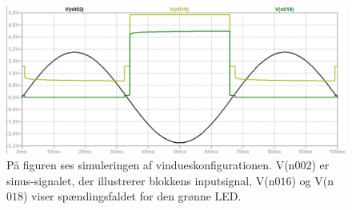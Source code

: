 \begin{figure}[H]
	\centering
	\includegraphics[scale=0.36]{figures/cProblemloesning/vindues_konfiguration.PNG}
	\caption{På figuren ses simuleringen af vindueskonfigurationen. V(n$002$) er sinus-signalet, der illustrerer blokkens inputsignal, V(n$016$) og V(n$018$) viser spændingsfaldet for den grønne LED.}
	\label{fig:vindues_konfiguration}
\end{figure}


